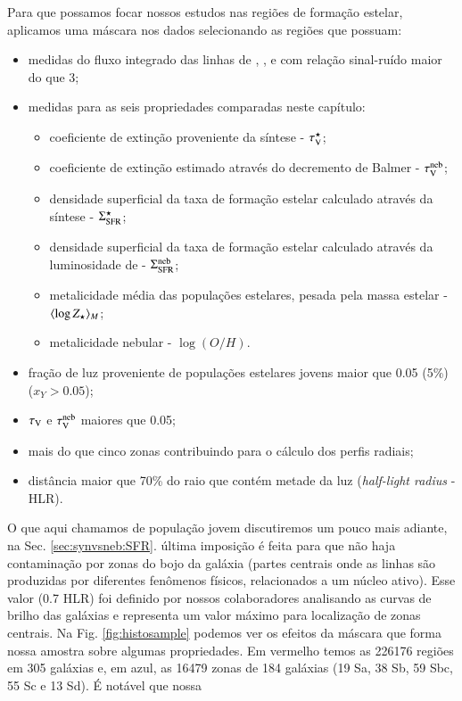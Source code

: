 Para que possamos focar nossos estudos nas regiões de formação estelar, aplicamos uma máscara nos
dados selecionando as regiões que possuam:
\begin{itemize}
  \setlength\itemsep{0.2cm}
  \item medidas do fluxo integrado das linhas de \Hbeta, \oIII, \Halpha e \nII com relação
sinal-ruído maior do que 3;
  \item medidas para as seis propriedades comparadas neste capítulo:
  \begin{itemize}
    \item coeficiente de extinção proveniente da síntese - $\tau_{\mathrm{V}}^\star$;
    \item coeficiente de extinção estimado através do decremento de Balmer - $\tau_{\mathrm{V}}^{\mathrm{neb}}$;
    \item densidade superficial da taxa de formação estelar calculado através da síntese -
$\Sigma_{\mathrm{SFR}}^\star$;
	\item densidade superficial da taxa de formação estelar calculado através da luminosidade de
\Halpha - $\Sigma_{\mathrm{SFR}}^{\mathrm{neb}}$;
	\item metalicidade média das populações estelares, pesada pela massa estelar - $\meanM{\log
Z_\star}$;
	\item metalicidade nebular - $\log(O/H)$.
  \end{itemize}
  \item fração de luz proveniente de populações estelares jovens maior que 0.05 (5\%) ($x_Y >
0.05$);
  \item $\tau_{\mathrm{V}}$ e $\tau_{\mathrm{V}}^{\mathrm{neb}}$ maiores que 0.05;
  \item mais do que cinco zonas contribuindo para o cálculo dos perfis radiais;
  \item distância maior que 70\% do raio que contém metade da luz ({\em half-light radius} - HLR).
\end{itemize}
\noindent O que aqui chamamos de população jovem discutiremos um pouco mais adiante, na Sec.
\ref{sec:synvsneb:SFR}. última imposição é feita para que não haja contaminação por zonas
do bojo da galáxia (partes centrais onde as linhas são produzidas por diferentes fenômenos físicos,
relacionados a um núcleo ativo). Esse valor (0.7 HLR) foi definido por nossos colaboradores
analisando as curvas de brilho das galáxias e representa um valor máximo para localização de zonas
centrais. Na Fig. \ref{fig:histosample} podemos ver os efeitos da máscara que forma nossa
amostra sobre algumas propriedades. Em vermelho temos as 226176 regiões em 305 galáxias e, em
azul, as 16479 zonas de 184 galáxias (19 Sa, 38 Sb, 59 Sbc, 55 Sc e 13 Sd). É notável que nossa
